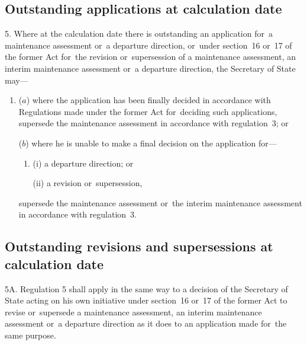 \documentclass[12pt,a4paper]{article}
\begin{document}

\subsection[5. Outstanding applications at calculation date]{Outstanding applications at calculation date}

5.  Where at the calculation date there is outstanding an application for~a maintenance assessment or~a departure direction, or~under section~16 or~17 of the former Act for~the revision or~supersession of a maintenance assessment, an interim maintenance assessment or~a departure direction, the Secretary of State may—
\begin{enumerate}\item[]
($a$) where the application has been finally decided in accordance with Regulations made under the former Act for~deciding such applications, supersede the maintenance assessment in accordance with regulation~3; or

($b$) where he is unable to make a final decision on the application for—
\begin{enumerate}\item[]
(i) a departure direction; or

(ii) a revision or~supersession,
\end{enumerate}
supersede the maintenance assessment or~the interim maintenance assessment in accordance with regulation~3.
\end{enumerate}

\subsection[5A. Outstanding revisions and~supersessions at calculation date]{\sloppy Outstanding revisions and supersessions at calculation date}

5A.  Regulation 5 shall apply in the same way to a decision of the Secretary of State acting on his own initiative under section~16 or~17 of the former Act to revise or~supersede a maintenance assessment, an interim maintenance assessment or~a departure direction as it does to an application made for~the same purpose.

\end{document}
